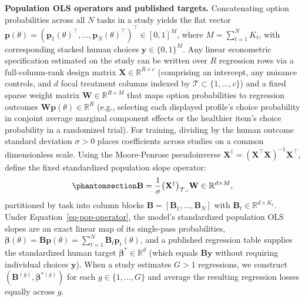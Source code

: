 \documentclass[
  11pt,
  letterpaper,
]{article}
\begin{document}
\textbf{Population OLS operators and published targets.} Concatenating
option probabilities across all \(N\) tasks in a study yields the flat
vector
\(\mathbf{p}(\theta) = (\mathbf{p}_1(\theta)^\top, \dots, \mathbf{p}_N(\theta)^\top)^\top \in [0, 1]^M\),
where \(M = \sum_{t=1}^N K_t\), with corresponding stacked human choices
\(\mathbf{y} \in \{0, 1\}^M\). Any linear econometric specification
estimated on the study can be written over \(R\) regression rows via a
full-column-rank design matrix
\(\mathbf{X} \in \mathbb{R}^{R \times c}\) (comprising an intercept, any
nuisance controls, and \(d\) focal treatment columns indexed by
\(\mathcal{T} \subset \{1, \dots, c\}\)) and a fixed sparse weight
matrix \(\mathbf{W} \in \mathbb{R}^{R \times M}\) that maps option
probabilities to regression outcomes
\(\mathbf{W}\mathbf{p}(\theta) \in \mathbb{R}^R\) (e.g., selecting each
displayed profile's choice probability in conjoint average marginal
component effects or the healthier item's choice probability in a
randomized trial). For training, dividing by the human outcome standard
deviation \(\sigma > 0\) places coefficients across studies on a common
dimensionless scale. Using the Moore-Penrose pseudoinverse
\(\mathbf{X}^\dagger = (\mathbf{X}^\top \mathbf{X})^{-1}\mathbf{X}^\top\),
define the fixed standardized population slope operator:
\begin{equation}\protect\phantomsection\label{eq-pop-operator}{
\mathbf{B} = \frac{1}{\sigma} \big(\mathbf{X}^\dagger\big)_{\mathcal{T}, :} \mathbf{W} \in \mathbb{R}^{d \times M},
}\end{equation} partitioned by task into column blocks
\(\mathbf{B} = [\mathbf{B}_1, \dots, \mathbf{B}_N]\) with
\(\mathbf{B}_t \in \mathbb{R}^{d \times K_t}\). Under
Equation~\ref{eq-pop-operator}, the model's standardized population OLS
slopes are an exact linear map of its single-pass probabilities,
\(\boldsymbol{\beta}(\theta) = \mathbf{B}\mathbf{p}(\theta) = \sum_{t=1}^N \mathbf{B}_t \mathbf{p}_t(\theta)\),
and a published regression table supplies the standardized human target
\(\boldsymbol{\beta}^* \in \mathbb{R}^d\) (which equals
\(\mathbf{B}\mathbf{y}\) without requiring individual choices
\(\mathbf{y}\)). When a study estimates \(G > 1\) regressions, we
construct \((\mathbf{B}^{(g)}, \boldsymbol{\beta}^{*(g)})\) for each
\(g \in \{1, \dots, G\}\) and average the resulting regression losses
equally across \(g\).
\end{document}
